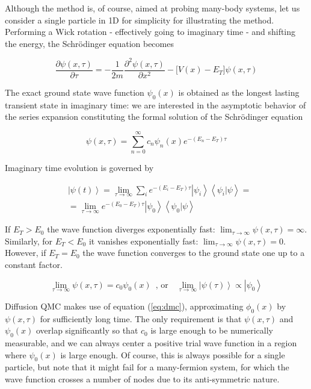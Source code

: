 Although the method is, of course, aimed at probing many-body systems, let us consider a single particle in \acl{1D} for simplicity for illustrating the method.
Performing a Wick rotation - effectively going to imaginary time - and shifting the energy, the Schr\"odinger equation becomes

\begin{equation}
\frac{\partial \psi ( x, \tau )}{\partial\tau}  = -\frac{1}{2m}\frac{\partial^2 \psi ( x, \tau )}{\partial x^2} - \bigg[ V(x) - E_T \bigg] \psi( x, \tau ) 
\end{equation}

The exact ground state wave function $\psi_0 ( x )$ is obtained as the longest lasting transient state in imaginary time: we are interested in the asymptotic behavior of the series expansion constituting the formal solution of the Schr\"odinger equation

\begin{equation}
\psi (x, \tau) = \sum_{n=0}^{\infty} c_n \psi_n (x) e^{-(E_n - E_T)\tau}
\end{equation}

Imaginary time evolution is governed by

\begin{equation}\label{eq:im_ev}
\begin{split}
&\left| \psi (t) \right\rangle = \lim_{\tau \rightarrow \infty} \sum_i e^{-(E_i - E_T) \tau} \left|\psi_i \right\rangle \left\langle \psi_i | \psi \right\rangle = \\
&= \lim_{\tau \rightarrow \infty} e^{-(E_0 - E_T)\tau} \left| \psi_0 \right\rangle \left\langle \psi_0 | \psi \right\rangle 
\end{split}
\end{equation}


If $E_T > E_0$ the wave function diverges exponentially fast: $\lim_{\tau \rightarrow \infty} \psi ( x, \tau) = \infty$.
Similarly, for $E_T < E_0$ it vanishes exponentially fast: $\lim_{\tau \rightarrow \infty} \psi ( x, \tau) = 0$.
However, if $E_T = E_0$ the wave function converges to the ground state one up to a constant factor.

\begin{equation}\label{eq:dmc}
\lim_{\tau \rightarrow \infty} \psi ( x, \tau) = c_0 \psi_0 (x) \,\,\, \text{, or} \quad \lim_{\tau \rightarrow \infty} \left|\psi (\tau) \right\rangle \propto \left| \psi_0 \right\rangle
\end{equation}

Diffusion \ac{QMC} makes use of equation (\ref{eq:dmc}), approximating $\phi_0(x)$ by $\psi (x, \tau)$ for sufficiently long time.
The only requirement is that $\psi (x, \tau)$ and $\psi_0(x)$ overlap significantly so that $c_0$ is large enough to be numerically measurable, and we can always center a positive trial wave function in a region where $\psi_0(x)$ is large enough.
Of course, this is always possible for a single particle, but note that it might fail for a many-fermion system, for which the wave function crosses a number of nodes due to its anti-symmetric nature.